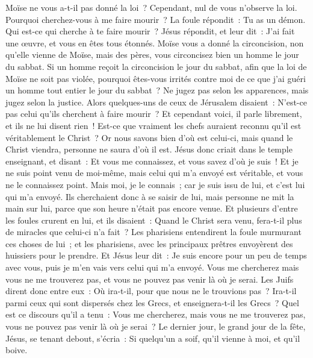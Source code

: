 \begin{multicols}{2}
Moïse ne vous a-t-il pas donné la loi~? Cependant, nul de vous n'observe la loi. Pourquoi cherchez-vous à me faire mourir~?
La foule répondit~: Tu as un démon. Qui est-ce qui cherche à te faire mourir~?
Jésus répondit, et leur dit~: J'ai fait une œuvre, et vous en êtes tous étonnés.
Moïse vous a donné la circoncision, non qu'elle vienne de Moïse, mais des pères, vous circoncisez bien un homme le jour du sabbat.
Si un homme reçoit la circoncision le jour du sabbat, afin que la loi de Moïse ne soit pas violée, pourquoi êtes-vous irrités contre moi de ce que j'ai guéri un homme tout entier le jour du sabbat~?
Ne jugez pas selon les apparences, mais jugez selon la justice.
Alors quelques-uns de ceux de Jérusalem disaient~: N'est-ce pas celui qu'ils cherchent à faire mourir~?
Et cependant voici, il parle librement, et ils ne lui disent rien~! Est-ce que vraiment les chefs auraient reconnu qu'il est véritablement le Christ~?
Or nous savons bien d'où est celui-ci, mais quand le Christ viendra, personne ne saura d'où il est.
Jésus donc criait dans le temple enseignant, et disant~: Et vous me connaissez, et vous savez d'où je suis~! Et je ne suis point venu de moi-même, mais celui qui m'a envoyé est véritable, et vous ne le connaissez point. 
Mais moi, je le connais~; car je suis issu de lui, et c'est lui qui m'a envoyé.
Ils cherchaient donc à se saisir de lui, mais personne ne mit la main sur lui, parce que son heure n'était pas encore venue.
Et plusieurs d'entre les foules crurent en lui, et ils disaient~: Quand le Christ sera venu, fera-t-il plus de miracles que celui-ci n'a fait~?
Les pharisiens entendirent la foule murmurant ces choses de lui~; et les pharisiens, avec les principaux prêtres envoyèrent des huissiers pour le prendre.
Et Jésus leur dit~: Je suis encore pour un peu de temps avec vous, puis je m'en vais vers celui qui m'a envoyé.
Vous me chercherez mais vous ne me trouverez pas, et vous ne pouvez pas venir là où je serai.
Les Juifs dirent donc entre eux~: Où ira-t-il, pour que nous ne le trouvions pas~? Ira-t-il parmi ceux qui sont dispersés chez les Grecs, et enseignera-t-il les Grecs~?
Quel est ce discours qu'il a tenu~: Vous me chercherez, mais vous ne me trouverez pas, vous ne pouvez pas venir là où je serai~?
Le dernier jour, le grand jour de la fête, Jésus, se tenant debout, s'écria~: Si quelqu'un a soif, qu'il vienne à moi, et qu'il boive.

\end{multicols}
